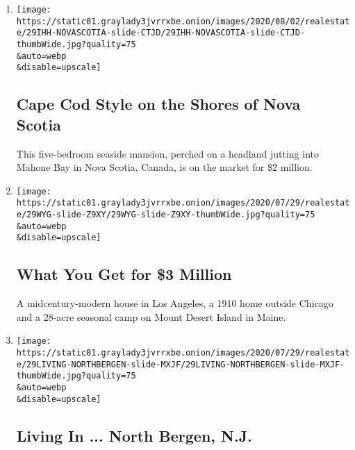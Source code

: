 \begin{enumerate}
\def\labelenumi{\arabic{enumi}.}
\item
  \href{/slideshow/2020/07/29/realestate/cape-cod-style-on-the-shores-of-nova-scotia.html}{}

  \texttt{[image: https://static01.graylady3jvrrxbe.onion/images/2020/08/02/realestate/29IHH-NOVASCOTIA-slide-CTJD/29IHH-NOVASCOTIA-slide-CTJD-thumbWide.jpg?quality=75\\\&auto=webp\\\&disable=upscale]}

  \hypertarget{cape-cod-style-on-the-shores-of-nova-scotia}{%
  \subsection{Cape Cod Style on the Shores of Nova
  Scotia}\label{cape-cod-style-on-the-shores-of-nova-scotia}}

  This five-bedroom seaside mansion, perched on a headland jutting into
  Mahone Bay in Nova Scotia, Canada, is on the market for \$2 million.
\item
  \href{/slideshow/2020/07/29/realestate/what-you-get-for-3-million.html}{}

  \texttt{[image: https://static01.graylady3jvrrxbe.onion/images/2020/07/29/realestate/29WYG-slide-Z9XY/29WYG-slide-Z9XY-thumbWide.jpg?quality=75\\\&auto=webp\\\&disable=upscale]}

  \hypertarget{what-you-get-for-3-million}{%
  \subsection{What You Get for \$3
  Million}\label{what-you-get-for-3-million}}

  A midcentury-modern house in Los Angeles, a 1910 home outside Chicago
  and a 28-acre seasonal camp on Mount Desert Island in Maine.
\item
  \href{/slideshow/2020/07/29/realestate/living-in-north-bergen-nj.html}{}

  \texttt{[image: https://static01.graylady3jvrrxbe.onion/images/2020/07/29/realestate/29LIVING-NORTHBERGEN-slide-MXJF/29LIVING-NORTHBERGEN-slide-MXJF-thumbWide.jpg?quality=75\\\&auto=webp\\\&disable=upscale]}

  \hypertarget{living-in--north-bergen-nj}{%
  \subsection{Living In ... North Bergen,
  N.J.}\label{living-in--north-bergen-nj}}


\end{enumerate}
